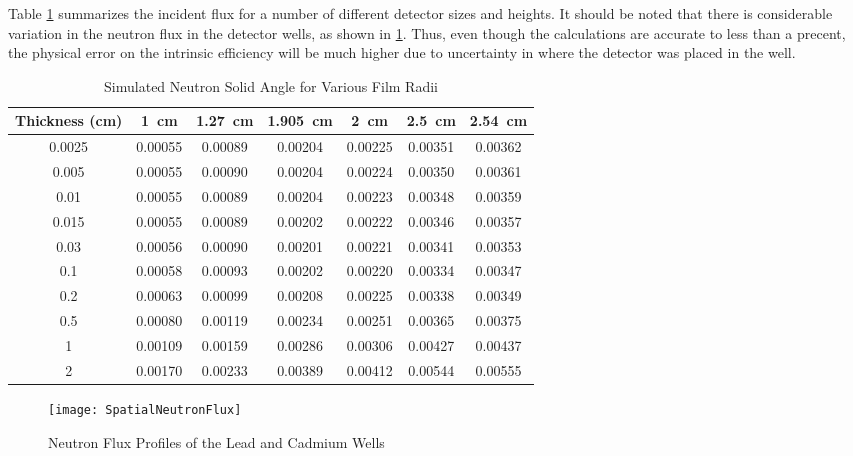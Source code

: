 \documentclass[draftcls,onecolumn]{IEEEtran}
\begin{document}
Table \ref{tab:NeutronSolidAngle} summarizes the incident flux for a number of different detector sizes and heights.
It should be noted that there is considerable variation in the neutron flux in the detector wells, as shown in \ref{fig:NeutronFluxProfiles}.
Thus, even though the calculations are accurate to less than a precent, the physical error on the intrinsic efficiency will be much higher due to uncertainty in where the detector was placed in the well.

\begin{table}
	\centering
	\caption{Simulated Neutron Solid Angle for Various Film Radii}
	\label{tab:NeutronSolidAngle}
	\begin{tabular}{c | c c c c c c}
Thickness (\si{\cm})	&	\SI{1}{\cm}	&	\SI{1.27}{\cm}	&	\SI{1.905}{\cm}	&	\SI{2}{\cm}	&	\SI{2.5}{\cm}	&	\SI{2.54}{\cm} \\ \hline
0.0025	&	0.00055	&	0.00089	&	0.00204	&	0.00225	&	0.00351	&	0.00362	\\
0.005	&	0.00055	&	0.00090	&	0.00204	&	0.00224	&	0.00350	&	0.00361	\\
0.01	&	0.00055	&	0.00089	&	0.00204	&	0.00223	&	0.00348	&	0.00359	\\
0.015	&	0.00055	&	0.00089	&	0.00202	&	0.00222	&	0.00346	&	0.00357	\\
0.03	&	0.00056	&	0.00090	&	0.00201	&	0.00221	&	0.00341	&	0.00353	\\
0.1	&	0.00058	&	0.00093	&	0.00202	&	0.00220	&	0.00334	&	0.00347	\\
0.2	&	0.00063	&	0.00099	&	0.00208	&	0.00225	&	0.00338	&	0.00349	\\
0.5	&	0.00080	&	0.00119	&	0.00234	&	0.00251	&	0.00365	&	0.00375	\\
1	&	0.00109	&	0.00159	&	0.00286	&	0.00306	&	0.00427	&	0.00437	\\
2	&	0.00170	&	0.00233	&	0.00389	&	0.00412	&	0.00544	&	0.00555	\\
	\end{tabular}
\end{table}
\begin{figure}
	\texttt{[image: SpatialNeutronFlux]}
  \caption{Neutron Flux Profiles of the Lead and Cadmium Wells}
  \label{fig:NeutronFluxProfiles}
\end{figure}
\end{document}

